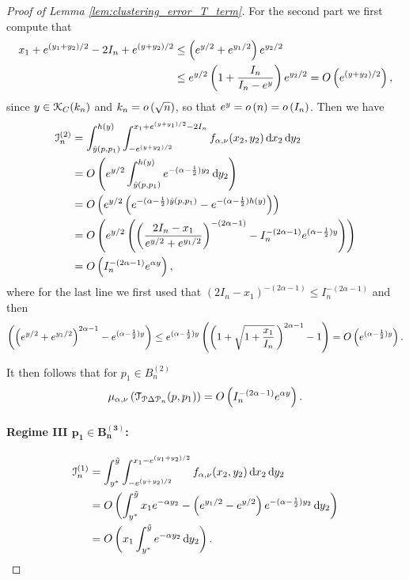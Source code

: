 \begin{proof}[Proof of Lemma \ref{lem:clustering_error_T_term}]
For the second part we first compute that 
\begin{align*}
	x_1 + e^{(y_1+y_2)/2} - 2 I_n + e^{(y + y_2)/2} &\le \left(e^{y/2} + e^{y_1/2}\right)e^{y_2/2}\\
	&\le e^{y/2}\left(1 + \frac{I_n}{I_n - e^y}\right)e^{y_2/2} = O\left(e^{(y+y_2)/2}\right),
\end{align*}
since $y \in {\mathcal K}_{C}(k_n)$ and $k_n = o\left(\sqrt{n}\right)$, so that $e^y = o\left(n\right) = o\left(I_n\right)$. 
Then we have
\begin{align*}
	\mathcal{I}_n^{(2)} &= \int_{\hat{y}(p,p_1)}^{h(y)} \int_{-e^{(y + y_2)/2}}^{x_1 + e^{(y+y_1)/2} - 2 I_n} 
		f_{\alpha,\nu}(x_2, y_2) \operatorname{\mathrm{d}\hspace{-2pt}} x_2 \operatorname{\mathrm{d}\hspace{-2pt}} y_2\\
	&= O\left(e^{y/2} \int_{\hat{y}(p,p_1)}^{h(y)} e^{-(\alpha -\frac{1}{2}) y_2} \operatorname{\mathrm{d}\hspace{-2pt}} y_2\right)\\
	&= O\left(e^{y/2} \left(e^{-(\alpha -\frac{1}{2}) \hat{y}(p,p_1)} - e^{-(\alpha -\frac{1}{2}) h(y)}\right)\right)\\
	&= O\left(e^{y/2} \left(\left(\frac{2I_n - x_1}{e^{y/2} + e^{y_1/2}}\right)^{-(2\alpha-1)} 
		- I_n^{-(2\alpha-1)} e^{(\alpha -\frac{1}{2}) y}\right)\right)\\
	&= O\left(I_n^{-(2\alpha-1)} e^{\alpha y}\right),
\end{align*}
where for the last line we first used that $(2I_n - x_1)^{-(2\alpha-1)} \le I_n^{-(2\alpha-1)}$ and then
\[
	\left(\left(e^{y/2} + e^{y_1/2}\right)^{2\alpha-1}- e^{(\alpha -\frac{1}{2}) y}\right)
	\le e^{(\alpha -\frac{1}{2}) y}\left(\left(1 + \sqrt{1+\frac{x_1}{I_n}} \, \right)^{2\alpha - 1} - 1\right)
	= O\left(e^{(\alpha -\frac{1}{2}) y}\right).
\]

It then follows that for $p_1 \in B_n^{(2)}$
\[
	\mu_{\alpha, \nu}\left(\mathcal{T}_{{\mathcal P} \Delta {\mathcal P}_n}(p,p_1)\right) = O\left(I_n^{-(2\alpha-1)} e^{\alpha y}\right).
\]

\paragraph{Regime III $\bm{p_1 \in B_n^{(3)}}$:}

\begin{align*}
	\mathcal{I}_n^{(1)} &= \int_{y^\ast}^{\tilde{y}} \int_{-e^{(y+y_2)/2}}^{x_1-e^{(y_1+y_2)/2}} f_{\alpha, \nu}(x_2,y_2)
		\operatorname{\mathrm{d}\hspace{-2pt}} x_2 \operatorname{\mathrm{d}\hspace{-2pt}} y_2\\
	&= O\left(\int_{y^\ast}^{\tilde{y}} x_1 e^{-\alpha y_2} - \left(e^{y_1/2} - e^{y/2}\right)e^{-(\alpha - \frac{1}{2})y_2}
		\operatorname{\mathrm{d}\hspace{-2pt}} y_2\right)\\
	&= O\left(x_1 \int_{y^\ast}^{\tilde{y}}  e^{-\alpha y_2} \operatorname{\mathrm{d}\hspace{-2pt}} y_2\right).
\end{align*}


\end{proof}
